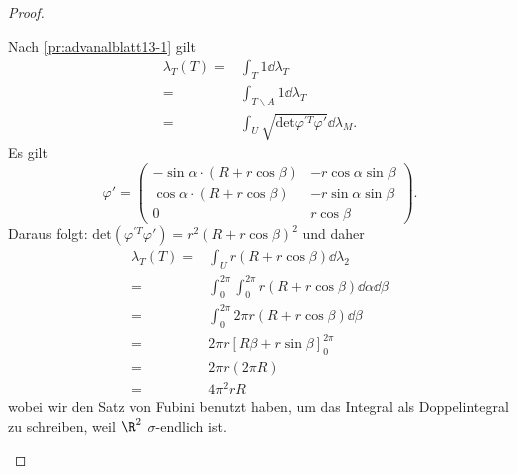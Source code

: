 \begin{proof}
\begin{parts}
	\item Nach \ref{pr:advanalblatt13-1} gilt
		\begin{align*}
			\lambda_T(T)=&\int_T 1\dd{\lambda_T}\\
			=&\int_{T\backslash A}1\dd{\lambda_T}\\
			=&\int_U  \sqrt{\text{det}\varphi^{\prime T}\varphi'} \dd{\lambda_M}.
		\end{align*}
		Es gilt
		\[
			\varphi'=\begin{pmatrix} -\sin\alpha\cdot (R+r\cos\beta) & -r\cos\alpha\sin\beta \\ \cos\alpha\cdot (R+r\cos\beta) & -r\sin\alpha\sin\beta \\ 0 & r\cos\beta \end{pmatrix} 
		.\] 
			Daraus folgt: $\text{det}(\varphi^{\prime T}\varphi')=r^2(R+r\cos\beta)^2$ und daher
			\begin{align*}
				\lambda_T(T)=&\int_U r(R+r\cos\beta)\dd{\lambda_2}\\
				=&\int_0^{2\pi}\int_0^{2\pi} r(R+r\cos\beta)\dd{\alpha}\dd{\beta}\\
				=&\int_0^{2\pi}2\pi r(R+r\cos\beta)\dd{\beta}\\
				=&2\pi r\left[ R\beta+r\sin\beta \right]_0^{2\pi}\\
				=&2\pi r(2\pi R)\\
				=&4\pi^2 rR
			\end{align*}
			wobei wir den Satz von Fubini benutzt haben, um das Integral als Doppelintegral zu schreiben, weil $\R^2$ $\sigma$-endlich ist.\qedhere
	\end{parts}
\end{proof}
